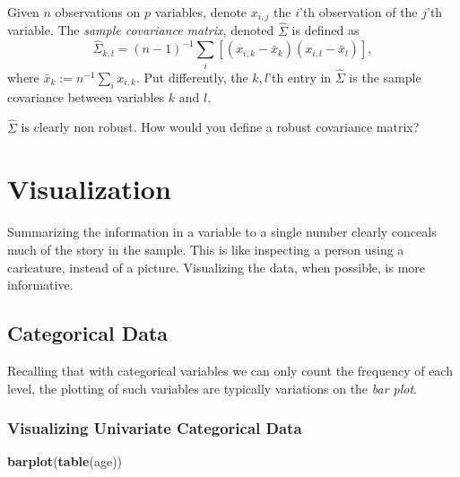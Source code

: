 \documentclass[]{book}
\newenvironment{Shaded}{\begin{snugshade}}{\end{snugshade}}
\newcommand{\KeywordTok}[1]{\textcolor[rgb]{0.13,0.29,0.53}{\textbf{#1}}}
\newcommand{\NormalTok}[1]{#1}
\theoremstyle{definition}
\theoremstyle{definition}
\theoremstyle{definition}
\theoremstyle{remark}
\let\BeginKnitrBlock\begin \let\EndKnitrBlock\end
\begin{document}
\BeginKnitrBlock{definition}[Sample Covariance Matrix]
\protect\hypertarget{def:unnamed-chunk-127}{}{\label{def:unnamed-chunk-127} {} }Given \(n\) observations on \(p\) variables, denote \(x_{i,j}\) the \(i\)'th observation of the \(j\)'th variable.
The \emph{sample covariance matrix}, denoted \(\hat \Sigma\) is defined as
\[\hat \Sigma_{k,l}=(n-1)^{-1} \sum_i [(x_{i,k}-\bar x_k)(x_{i,l}-\bar x_l)],\]
where \(\bar x_k:=n^{-1} \sum_i x_{i,k}\).
Put differently, the \(k,l\)'th entry in \(\hat \Sigma\) is the sample covariance between variables \(k\) and \(l\).
\EndKnitrBlock{definition}

\BeginKnitrBlock{remark}
{}\(\hat \Sigma\) is clearly non robust.
How would you define a robust covariance matrix?
\EndKnitrBlock{remark}

\hypertarget{visualization}{%
\section{Visualization}\label{visualization}}

Summarizing the information in a variable to a single number clearly conceals much of the story in the sample.
This is like inspecting a person using a caricature, instead of a picture.
Visualizing the data, when possible, is more informative.

\hypertarget{categorical-data-1}{%
\subsection{Categorical Data}\label{categorical-data-1}}

Recalling that with categorical variables we can only count the frequency of each level, the plotting of such variables are typically variations on the \emph{bar plot}.

\hypertarget{visualizing-univariate-categorical-data}{%
\subsubsection{Visualizing Univariate Categorical Data}\label{visualizing-univariate-categorical-data}}

\begin{Shaded}
\begin{Highlighting}[]
\KeywordTok{barplot}\NormalTok{(}\KeywordTok{table}\NormalTok{(age))}
\end{Highlighting}
\end{Shaded}
\end{document}
